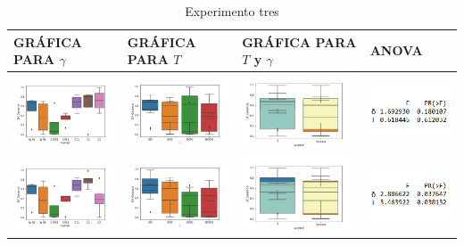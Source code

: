\begin{table}[H]
\caption{Experimento tres}
\centering
\begin{tabular}[c]{llll}
\multicolumn{1}{p{2.9cm}}{\textbf{GRÁFICA PARA $\gamma$}} & \multicolumn{1}{p{2.9cm}}{\textbf{GRÁFICA PARA $T$}} & \multicolumn{1}{p{2.9cm}}{\textbf{GRÁFICA PARA $T$ y $\gamma$}} & \multicolumn{1}{p{2.9cm}}{\textbf{ANOVA}}  \\ \hline
\multicolumn{1}{|l|}{\includegraphics[align=t, width=33mm]{cajasGamma_exp31.jpg}}    & \multicolumn{1}{l|}{\includegraphics[align=t, width=33mm]{cajasT_exp31.jpg} } & \multicolumn{1}{l|}{\includegraphics[align=t, width=33mm]{cajasT_Gamma_exp31.jpg} } &
\multicolumn{1}{p{3cm}|}{\includegraphics[align=t, width=30mm]{Anova31.png}}     \\ \hline
\multicolumn{1}{|l|}{\includegraphics[align=t, width=33mm]{cajasGamma_exp32.jpg}}    & \multicolumn{1}{l|}{\includegraphics[align=t, width=33mm]{cajasT_exp32.jpg} } & \multicolumn{1}{l|}{\includegraphics[align=t, width=33mm]{cajasT_Gamma_exp32.jpg} } & \multicolumn{1}{p{3cm}|}{\includegraphics[align=t, width=30mm]{Anova32.png}} \\ \hline

\end{tabular}
\end{table}
